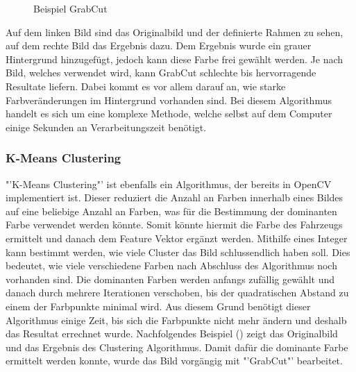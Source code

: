 {\begin{figure}[H]
  \centering
  \caption{Beispiel GrabCut}
  \label{bGrabCut}
\end{figure}

Auf dem linken Bild sind das Originalbild und der definierte Rahmen zu sehen, auf dem rechte Bild das Ergebnis dazu. Dem Ergebnis wurde ein grauer Hintergrund hinzugefügt, jedoch kann diese Farbe frei gewählt werden. Je nach Bild, welches verwendet wird, kann GrabCut schlechte bis hervorragende Resultate liefern. Dabei kommt es vor allem darauf an, wie starke Farbveränderungen im Hintergrund vorhanden sind. Bei diesem Algorithmus handelt es sich um eine komplexe Methode, welche selbst auf dem Computer einige Sekunden an Verarbeitungszeit benötigt. \cite{GrabCut}

\subsubsection{K-Means Clustering}
"'K-Means Clustering"' ist ebenfalls ein Algorithmus, der bereits in OpenCV implementiert ist. Dieser reduziert die Anzahl an Farben innerhalb eines Bildes auf eine beliebige Anzahl an Farben, was für die Bestimmung der dominanten Farbe verwendet werden könnte. Somit könnte hiermit die Farbe des Fahrzeugs ermittelt und danach dem Feature Vektor ergänzt werden. Mithilfe eines Integer kann bestimmt werden, wie viele Cluster das Bild schlussendlich haben soll. Dies bedeutet, wie viele verschiedene Farben nach Abschluss des Algorithmus noch vorhanden sind. Die dominanten Farben werden anfangs zufällig gewählt und danach durch mehrere Iterationen verschoben, bis der quadratischen Abstand zu einem der Farbpunkte minimal wird. Aus diesem Grund benötigt dieser Algorithmus einige Zeit, bis sich die Farbpunkte nicht mehr ändern und deshalb das Resultat errechnet wurde. Nachfolgendes Beispiel () zeigt das Originalbild und das Ergebnis des Clustering Algorithmus. Damit dafür die dominante Farbe ermittelt werden konnte, wurde das Bild vorgängig mit "'GrabCut"' bearbeitet.

}
